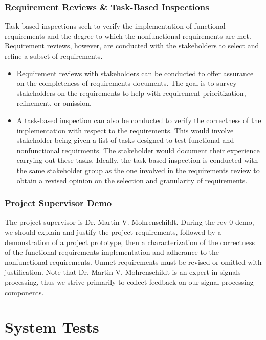 \documentclass[12pt, titlepage]{article}
\begin{document}
\subsubsection{Requirement Reviews \& Task-Based Inspections}
Task-based inspections seek to verify the implementation of functional requirements and the degree to which the nonfunctional requirements are met. Requirement reviews, however, are conducted with the stakeholders to select and refine a subset of requirements.
\begin{itemize}
\item Requirement reviews with stakeholders can be conducted to offer assurance on the completeness of requirements documents. The goal is to survey stakeholders on the requirements to help with requirement prioritization, refinement, or omission.

\item A task-based inspection can also be conducted to verify the correctness of the implementation with respect to the requirements. This would involve stakeholder being given a list of tasks designed to test functional and nonfunctional requirments. The stakeholder would document their experience carrying out these tasks. Ideally, the task-based inspection is conducted with the same stakeholder group as the one involved in the requirements review to obtain a revised opinion on the selection and granularity of requirements.
\end{itemize}

\subsubsection{Project Supervisor Demo}
The project supervisor is Dr. Martin V. Mohrenschildt. During the rev 0 demo, we should explain and justify the project requirements, followed by a demonstration of a project prototype, then a characterization of the correctness of the functional requirements implementation and adherance to the nonfunctional requirements. Unmet requirements must be revised or omitted with justification. Note that Dr. Martin V. Mohrenschildt is an expert in signals processing, thus we strive primarily to collect feedback on our signal processing components.

\section{System Tests}

\end{document}
